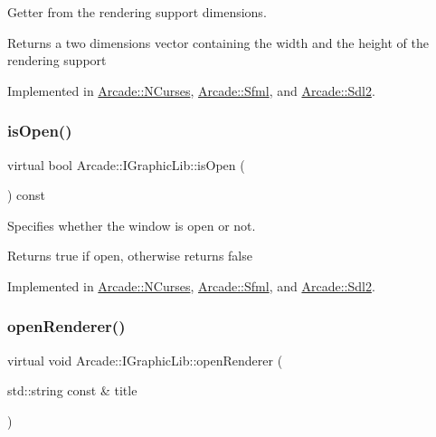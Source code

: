 Getter from the rendering support dimensions. 

\begin{DoxyReturn}{Returns}
a two dimensions vector containing the width and the height of the rendering support 
\end{DoxyReturn}


Implemented in \hyperlink{class_arcade_1_1_n_curses_ae7a4eb70b4a07dc2d65f135c6f7ceb50}{Arcade\+::\+N\+Curses}, \hyperlink{class_arcade_1_1_sfml_aa2fe7257182649ba0273712d36296460}{Arcade\+::\+Sfml}, and \hyperlink{class_arcade_1_1_sdl2_ae54d60076b915de4fce36ace576ea01d}{Arcade\+::\+Sdl2}.

\mbox{\label{class_arcade_1_1_i_graphic_lib_adf9e107fbcfbd91e5a3daa9a2db76b4b}} 
\subsubsection{\texorpdfstring{is\+Open()}{isOpen()}}
{\footnotesize\ttfamily virtual bool Arcade\+::\+I\+Graphic\+Lib\+::is\+Open (\begin{DoxyParamCaption}{ }\end{DoxyParamCaption}) const\hspace{0.3cm}{\ttfamily [pure virtual]}}



Specifies whether the window is open or not. 

\begin{DoxyReturn}{Returns}
true if open, otherwise returns false 
\end{DoxyReturn}


Implemented in \hyperlink{class_arcade_1_1_n_curses_a04a81ada3532d84f6369479c0779dd1a}{Arcade\+::\+N\+Curses}, \hyperlink{class_arcade_1_1_sfml_a427b6fc608c3b52f167b1fe79f5a5009}{Arcade\+::\+Sfml}, and \hyperlink{class_arcade_1_1_sdl2_a44772ea99509adde0a1c8779265ce260}{Arcade\+::\+Sdl2}.

\mbox{\label{class_arcade_1_1_i_graphic_lib_a71f7f51bdd61b02377c4a9ec330eabb1}} 
\subsubsection{\texorpdfstring{open\+Renderer()}{openRenderer()}}
{\footnotesize\ttfamily virtual void Arcade\+::\+I\+Graphic\+Lib\+::open\+Renderer (\begin{DoxyParamCaption}\item[{std\+::string const \&}]{title }\end{DoxyParamCaption})\hspace{0.3cm}{\ttfamily [pure virtual]}}



